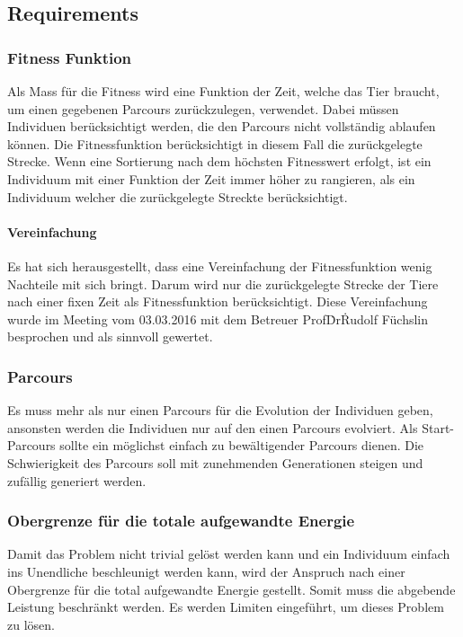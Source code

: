   \subsection{Requirements}

    \subsubsection{Fitness Funktion}

      Als Mass für die Fitness wird eine Funktion der Zeit, welche das Tier braucht,
      um einen gegebenen Parcours zurückzulegen, verwendet.
      Dabei müssen Individuen berücksichtigt werden,
      die den Parcours nicht vollständig ablaufen können.
      Die Fitnessfunktion berücksichtigt in diesem Fall die zurückgelegte Strecke.
      Wenn eine Sortierung nach dem höchsten Fitnesswert erfolgt,
      ist ein Individuum mit einer Funktion der Zeit immer höher zu rangieren,
      als ein Individuum welcher die zurückgelegte Streckte berücksichtigt.

      \paragraph{Vereinfachung}

        Es hat sich herausgestellt, dass eine Vereinfachung der Fitnessfunktion wenig Nachteile mit sich bringt.
        Darum wird nur die zurückgelegte Strecke der Tiere nach einer fixen Zeit als Fitnessfunktion berücksichtigt.
        Diese Vereinfachung wurde im Meeting vom 03.03.2016 mit dem Betreuer Prof\. Dr\. Rudolf Füchslin besprochen
        und als sinnvoll gewertet.

    \subsubsection{Parcours}

      Es muss mehr als nur einen Parcours für die Evolution der Individuen geben,
      ansonsten werden die Individuen nur auf den einen Parcours evolviert.
      Als Start-Parcours sollte ein möglichst einfach zu bewältigender Parcours dienen.
      Die Schwierigkeit des Parcours soll mit zunehmenden Generationen steigen und zufällig generiert werden.

    \subsubsection{Obergrenze für die totale aufgewandte Energie}

      Damit das Problem nicht trivial gelöst werden kann
      und ein Individuum einfach ins Unendliche beschleunigt werden kann,
      wird der Anspruch nach einer Obergrenze für die total aufgewandte Energie gestellt.
      Somit muss die abgebende Leistung beschränkt werden. Es werden Limiten eingeführt,
      um dieses Problem zu lösen.
